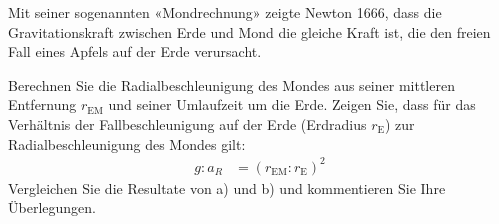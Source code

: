 Mit seiner sogenannten «Mondrechnung» zeigte Newton 1666, dass die Gravitationskraft zwischen Erde und Mond die gleiche Kraft ist, die den freien Fall eines Apfels auf der Erde verursacht.

\begin{abcliste}
\abc Berechnen Sie die Radialbeschleunigung des Mondes aus seiner mittleren Entfernung $r_\mathrm{EM}$ und seiner Umlaufzeit um die Erde.
\abc Zeigen Sie, dass für das Verhältnis der Fallbeschleunigung auf der Erde (Erdradius $r_\mathrm{E}$) zur Radialbeschleunigung des Mondes gilt:
\begin{align}
 g : a_R &= \left(r_\mathrm{EM} : r_\mathrm{E}\right)^2
\end{align}
\abc Vergleichen Sie die Resultate von a) und b) und kommentieren Sie Ihre Überlegungen.
\end{abcliste}
